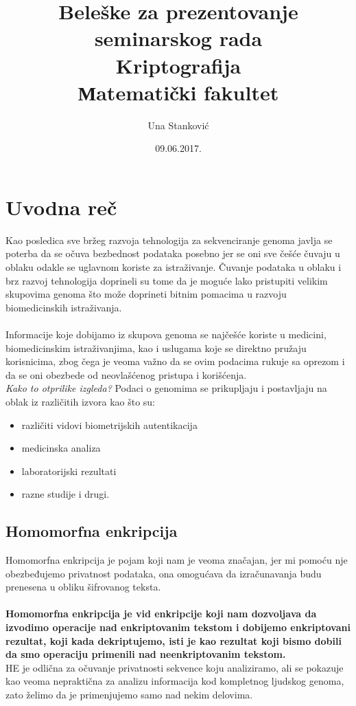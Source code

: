 \documentclass[a4paper]{article}
\begin{document}
\title{Beleške za prezentovanje seminarskog rada\\ \small{Kriptografija\\ Мatematički fakultet}}

\author{Una Stanković}
\date{09.06.2017.}
\maketitle

\section{Uvodna reč} 
Kao posledica sve bržeg razvoja tehnologija za sekvenciranje genoma javlja se poterba da se očuva bezbednost podataka posebno jer se oni sve češće čuvaju u oblaku odakle se uglavnom koriste za istraživanje. Čuvanje podataka u oblaku i brz razvoj tehnologija doprineli su tome da je moguće lako pristupiti velikim skupovima genoma što može doprineti bitnim pomacima u razvoju biomedicinskih istraživanja.\\\\
Informacije koje dobijamo iz skupova genoma se najčešće koriste u medicini, biomedicinskim istraživanjima, kao i uslugama koje se direktno pružaju korisnicima, zbog čega je veoma važno da se ovim podacima rukuje sa oprezom i da se oni obezbede od neovlašćenog pristupa i korišćenja.\\

\textit{Kako to otprilike izgleda?}
Podaci o genomima se prikupljaju i postavljaju na oblak iz različitih izvora kao što su:
\begin{itemize}
\item različiti vidovi biometrijskih autentikacija
\item medicinska analiza
\item laboratorijski rezultati 
\item razne studije i drugi.
\end{itemize}


\subsection{Homomorfna enkripcija}
Homomorfna enkripcija je pojam koji nam je veoma značajan, jer mi pomoću nje obezbeđujemo privatnost podataka, ona omogućava da izračunavanja budu prenesena u obliku šifrovanog teksta.\\\\
\textbf{Homomorfna enkripcija je vid enkripcije koji nam dozvoljava da izvodimo operacije nad enkriptovanim tekstom i dobijemo enkriptovani rezultat, koji kada dekriptujemo, isti je kao rezultat koji bismo dobili da smo operaciju primenili nad neenkriptovanim tekstom.}\\
HE je odlična za očuvanje privatnosti sekvence koju analiziramo, ali se pokazuje kao veoma nepraktična za analizu informacija kod kompletnog ljudskog genoma, zato želimo da je primenjujemo samo nad nekim delovima.
\end{document}

